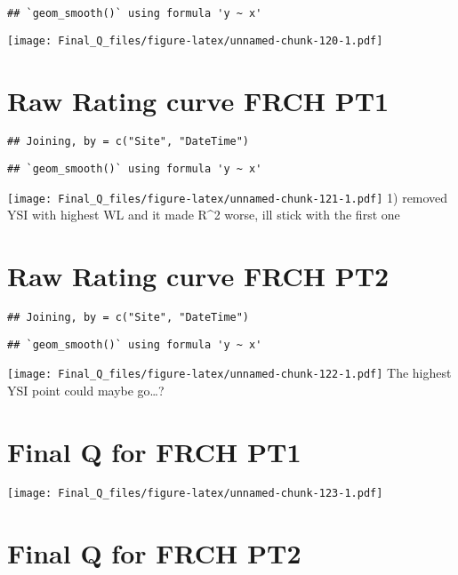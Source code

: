 \documentclass[
]{article}
\begin{document}
\begin{verbatim}
## `geom_smooth()` using formula 'y ~ x'
\end{verbatim}

\texttt{[image: Final\_Q\_files/figure-latex/unnamed-chunk-120-1.pdf]}

\hypertarget{raw-rating-curve-frch-pt1-1}{%
\section{Raw Rating curve FRCH PT1}\label{raw-rating-curve-frch-pt1-1}}

\begin{verbatim}
## Joining, by = c("Site", "DateTime")
\end{verbatim}

\begin{verbatim}
## `geom_smooth()` using formula 'y ~ x'
\end{verbatim}

\texttt{[image: Final\_Q\_files/figure-latex/unnamed-chunk-121-1.pdf]} 1)
removed YSI with highest WL and it made R\^{}2 worse, ill stick with the
first one

\hypertarget{raw-rating-curve-frch-pt2}{%
\section{Raw Rating curve FRCH PT2}\label{raw-rating-curve-frch-pt2}}

\begin{verbatim}
## Joining, by = c("Site", "DateTime")
\end{verbatim}

\begin{verbatim}
## `geom_smooth()` using formula 'y ~ x'
\end{verbatim}

\texttt{[image: Final\_Q\_files/figure-latex/unnamed-chunk-122-1.pdf]} The
highest YSI point could maybe go\ldots?

\hypertarget{final-q-for-frch-pt1}{%
\section{Final Q for FRCH PT1}\label{final-q-for-frch-pt1}}

\texttt{[image: Final\_Q\_files/figure-latex/unnamed-chunk-123-1.pdf]}

\hypertarget{final-q-for-frch-pt2}{%
\section{Final Q for FRCH PT2}\label{final-q-for-frch-pt2}}
\end{document}

